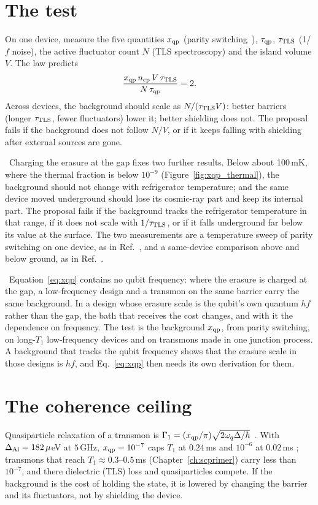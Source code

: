 \section{The test}
On one device, measure the five quantities $x_{\rm qp}$ (parity switching~\cite{Riste2013,Serniak2018}), $\tau_{\rm qp}$, $\tau_{\rm TLS}$ (1/$f$ noise), the active fluctuator count
$N$ (TLS spectroscopy) and the island volume $V$. The law predicts \prediction
\begin{equation}\frac{x_{\rm qp}\,n_{\rm cp}\,V\,\tau_{\rm TLS}}{N\,\tau_{\rm qp}}=2.\end{equation}
Across devices, the background should scale as $N/(\tau_{\rm TLS}V)$: better barriers (longer $\tau_{\rm TLS}$, fewer fluctuators) lower it; better
shielding does not. The proposal fails if the background does not follow $N/V$, or if it keeps falling with shielding after external sources are gone.

\prediction\ Charging the erasure at the gap fixes two further results. Below about 100\,mK, where the thermal fraction is below
$10^{-9}$ (Figure~\ref{fig:xqp_thermal}), the background should not change with refrigerator temperature; and the same device moved
underground should lose its cosmic-ray part and keep its internal part. The proposal fails if the background tracks the refrigerator
temperature in that range, if it does not scale with $1/\tau_{\rm TLS}$, or if it falls underground far below its value at the surface.
The two measurements are a temperature sweep of parity switching on one device, as in Ref.~\cite{Riste2013}, and a same-device
comparison above and below ground, as in Ref.~\cite{DeDominicis2026}.

\prediction\ Equation~\eqref{eq:xqp} contains no qubit frequency: where the erasure is charged at the gap, a low-frequency design and a
transmon on the same barrier carry the same background. In a design whose erasure scale is the qubit's own quantum $hf$ rather than the
gap, the bath that receives the cost changes, and with it the dependence on frequency. The test is the background $x_{\rm qp}$, from
parity switching, on long-$T_1$ low-frequency devices and on transmons made in one junction process. A background that tracks the qubit
frequency shows that the erasure scale in those designs is $hf$, and Eq.~\eqref{eq:xqp} then needs its own derivation for them.

\section{The coherence ceiling}
Quasiparticle relaxation of a transmon is $\Gamma_1=(x_{\rm qp}/\pi)\sqrt{2\omega_q\Delta/\hbar}$~\cite{Catelani2011}. With
$\Delta_{\rm Al}=182\,\mu$eV at $5$\,GHz, $x_{\rm qp}=10^{-7}$ caps $T_1$ at $0.24$\,ms and $10^{-6}$ at $0.02$\,ms \calc; transmons that reach
$T_1\approx0.3$--$0.5$\,ms (Chapter~\ref{ch:scprimer}) carry less than $10^{-7}$, and there dielectric (TLS) loss and quasiparticles compete. If the
background is the cost of holding the state, it is lowered by changing the barrier and its fluctuators, not by shielding the device.

